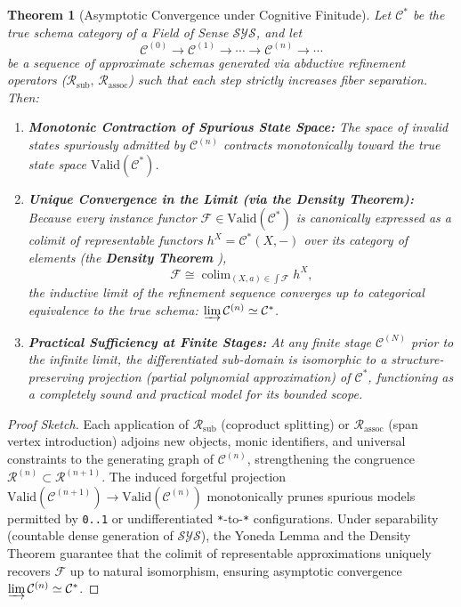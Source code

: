 \documentclass[11pt,a4paper]{article}
\theoremstyle{definition}
\theoremstyle{plain}
\newtheorem{theorem}{Theorem}[section]
\theoremstyle{remark}
\newcommand{\Valid}{\mathrm{Valid}}
\newcommand{\colim}{\operatorname{colim}}
\newcommand{\Rsub}{\mathcal{R}_{\mathrm{sub}}}
\newcommand{\Rassoc}{\mathcal{R}_{\mathrm{assoc}}}
\begin{document}
\begin{theorem}[Asymptotic Convergence under Cognitive Finitude]\label{thm:convergence}
Let $\mathcal{C}^*$ be the true schema category of a Field of Sense $\mathcal{SYS}$, and let
\begin{equation}
\mathcal{C}^{(0)} \longrightarrow \mathcal{C}^{(1)} \longrightarrow \cdots \longrightarrow \mathcal{C}^{(n)} \longrightarrow \cdots
\end{equation}
be a sequence of approximate schemas generated via abductive refinement operators ($\Rsub,\, \Rassoc$) such that each step strictly increases fiber separation. Then:
\begin{enumerate}
    \item \textbf{Monotonic Contraction of Spurious State Space:} The space of invalid states spuriously admitted by $\mathcal{C}^{(n)}$ contracts monotonically toward the true state space $\Valid(\mathcal{C}^*)$.
    \item \textbf{Unique Convergence in the Limit (via the Density Theorem):} Because every instance functor $\mathcal{F} \in \Valid(\mathcal{C}^*)$ is canonically expressed as a colimit of representable functors $h^X = \mathcal{C}^*(X, -)$ over its category of elements (the \textbf{Density Theorem} \cite{maclane1998,maclane1992}),
    \begin{equation}
    \mathcal{F} \cong \colim_{(X, a) \in \int \mathcal{F}} h^X,
    \end{equation}
    the inductive limit of the refinement sequence converges up to categorical equivalence to the true schema: $\varinjlim \mathcal{C}^{(n)} \simeq \mathcal{C}^*$.
    \item \textbf{Practical Sufficiency at Finite Stages:} At any finite stage $\mathcal{C}^{(N)}$ prior to the infinite limit, the differentiated sub-domain is isomorphic to a structure-preserving projection (partial polynomial approximation) of $\mathcal{C}^*$, functioning as a completely sound and practical model for its bounded scope.
\end{enumerate}
\end{theorem}

\begin{proof}[Proof Sketch]
Each application of $\Rsub$ (coproduct splitting) or $\Rassoc$ (span vertex introduction) adjoins new objects, monic identifiers, and universal constraints to the generating graph of $\mathcal{C}^{(n)}$, strengthening the congruence $\mathcal{R}^{(n)} \subset \mathcal{R}^{(n+1)}$. The induced forgetful projection $\Valid(\mathcal{C}^{(n+1)}) \to \Valid(\mathcal{C}^{(n)})$ monotonically prunes spurious models permitted by \texttt{0..1} or undifferentiated \texttt{*}-to-\texttt{*} configurations. Under separability (countable dense generation of $\mathcal{SYS}$), the Yoneda Lemma and the Density Theorem guarantee that the colimit of representable approximations uniquely recovers $\mathcal{F}$ up to natural isomorphism, ensuring asymptotic convergence $\varinjlim \mathcal{C}^{(n)} \simeq \mathcal{C}^*$. \qedhere
\end{proof}
\end{document}
